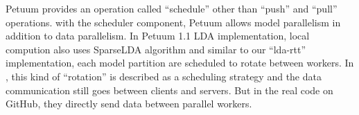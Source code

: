 \documentclass[conference]{IEEEtran}
\begin{document}
Petuum provides an operation called ``schedule'' other than ``push'' and ``pull'' operations.
with the scheduler component, Petuum allows model parallelism in addition to data parallelism.
In Petuum 1.1 LDA implementation, local compution also uses SparseLDA algorithm 
and similar to our ``lda-rtt'' implementation, each model partition 
are scheduled to rotate between workers. 
In \cite{21}, this kind of ``rotation'' is described as a scheduling strategy 
and the data communication still goes between clients and servers. 
But in the real code on GitHub, they directly send data between parallel workers.  
%
%
%
%
%
%
%
\end{document}
